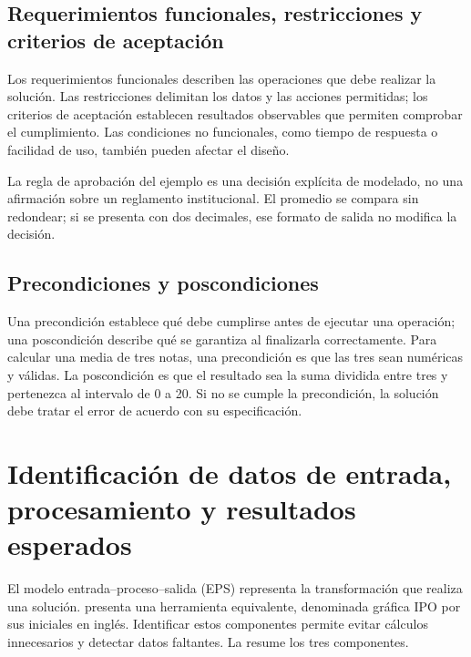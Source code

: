 \subsection{Requerimientos funcionales, restricciones y criterios de aceptación}

Los requerimientos funcionales describen las operaciones que debe realizar la solución. Las restricciones delimitan los datos y las acciones permitidas; los criterios de aceptación establecen resultados observables que permiten comprobar el cumplimiento. Las condiciones no funcionales, como tiempo de respuesta o facilidad de uso, también pueden afectar el diseño.



La regla de aprobación del ejemplo es una decisión explícita de modelado, no una afirmación sobre un reglamento institucional. El promedio se compara sin redondear; si se presenta con dos decimales, ese formato de salida no modifica la decisión.

\subsection{Precondiciones y poscondiciones}

Una precondición establece qué debe cumplirse antes de ejecutar una operación; una poscondición describe qué se garantiza al finalizarla correctamente. Para calcular una media de tres notas, una precondición es que las tres sean numéricas y válidas. La poscondición es que el resultado sea la suma dividida entre tres y pertenezca al intervalo de 0 a 20. Si no se cumple la precondición, la solución debe tratar el error de acuerdo con su especificación.

\section{Identificación de datos de entrada, procesamiento y resultados esperados}

El modelo entrada–proceso–salida (EPS) representa la transformación que realiza una solución. \textcite[p.~9]{farrell2013} presenta una herramienta equivalente, denominada gráfica IPO por sus iniciales en inglés. Identificar estos componentes permite evitar cálculos innecesarios y detectar datos faltantes. La  resume los tres componentes.


